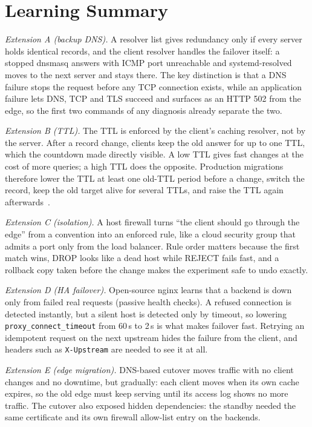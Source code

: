 \documentclass[conference,a4paper]{IEEEtran}
\newcommand{\cmd}[1]{\texttt{\small #1}}
\begin{document}
\section{Learning Summary}\label{sec:learning}

\emph{Extension A (backup DNS).} A resolver list gives redundancy only if every server holds identical records, and
the client resolver handles the failover itself: a stopped dnsmasq answers with ICMP port unreachable and
systemd-resolved moves to the next server and stays there. The key distinction is that a DNS failure stops the
request before any TCP connection exists, while an application failure lets DNS, TCP and TLS succeed and surfaces as
an HTTP 502 from the edge, so the first two commands of any diagnosis already separate the two.

\emph{Extension B (TTL).} The TTL is enforced by the client's caching resolver, not by the server. After a record
change, clients keep the old answer for up to one TTL, which the countdown made directly visible. A low TTL gives fast
changes at the cost of more queries; a high TTL does the opposite. Production migrations therefore lower the TTL at
least one old-TTL period before a change, switch the record, keep the old target alive for several TTLs, and raise the
TTL again afterwards~\cite{rfc1035,rfc2181}.

\emph{Extension C (isolation).} A host firewall turns ``the client should go through the edge'' from a convention into
an enforced rule, like a cloud security group that admits a port only from the load balancer. Rule order matters
because the first match wins, DROP looks like a dead host while REJECT fails fast, and a rollback copy taken before
the change makes the experiment safe to undo exactly.

\emph{Extension D (HA failover).} Open-source nginx learns that a backend is down only from failed real requests
(passive health checks). A refused connection is detected instantly, but a silent host is detected only by timeout, so
lowering \cmd{proxy\_connect\_timeout} from 60\,s to 2\,s is what makes failover fast. Retrying an idempotent request
on the next upstream hides the failure from the client, and headers such as \cmd{X-Upstream} are needed to see it at all.

\emph{Extension E (edge migration).} DNS-based cutover moves traffic with no client changes and no downtime, but
gradually: each client moves when its own cache expires, so the old edge must keep serving until its access log shows
no more traffic. The cutover also exposed hidden dependencies: the standby needed the same certificate and its own
firewall allow-list entry on the backends.
\end{document}
